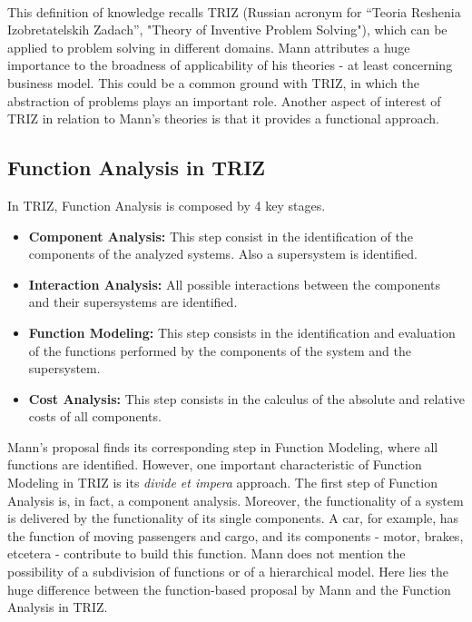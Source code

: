 \\
This definition of knowledge recalls TRIZ (Russian acronym
for “Teoria Reshenia Izobretatelskih Zadach”, "Theory of Inventive Problem Solving"), which can be applied to problem solving in different domains. \cite{TRIZ} Mann attributes a huge importance to the broadness of applicability of his theories - at least concerning business model. This could be a common ground with TRIZ, in which the abstraction of problems plays an important role. Another aspect of interest of TRIZ in relation to Mann's theories is that it provides a functional approach. 
\subsection{Function Analysis in TRIZ}
In TRIZ, Function Analysis is composed by 4 key stages.\cite{TrizManual}
\begin{itemize}
    \item \textbf{Component Analysis:} This step consist in the identification of the components of the analyzed systems. Also a supersystem is identified.
    \item \textbf{Interaction Analysis:} All possible interactions between the components and their supersystems are identified.
    \item \textbf{Function Modeling:} This step consists in the identification and evaluation of the functions performed by the components of the system and the supersystem.
    \item \textbf{Cost Analysis:} This step consists in the calculus of the absolute and relative costs of all components.
    \end{itemize}
Mann's proposal finds its corresponding step in Function Modeling, where all functions are identified. However, one important characteristic of Function Modeling in TRIZ is its \textit{divide et impera} approach. The first step of Function Analysis is, in fact, a component analysis. Moreover, the functionality of a system is delivered by the functionality of its single components. \cite{TrizManual} A car, for example, has the function of moving passengers and cargo, and its components - motor, brakes, etcetera - contribute to build this function. Mann does not mention the possibility of a subdivision of functions or of a hierarchical model. Here lies the huge difference between the function-based proposal by Mann and the Function Analysis in TRIZ. 
\newpage
